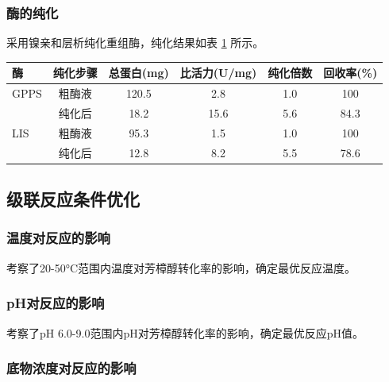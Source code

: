 \subsubsection{酶的纯化}


采用镍亲和层析纯化重组酶，纯化结果如表 \ref{tab:purification} 所示。

\begin{table}[h]
  \centering
  \label{tab:purification}
  \begin{tabular}{lccccc}
    \toprule
    \textbf{酶} & \textbf{纯化步骤} & \textbf{总蛋白(mg)} & \textbf{比活力(U/mg)} & \textbf{纯化倍数} & \textbf{回收率(\%)} \\
    \midrule
    GPPS & 粗酶液 & 120.5 & 2.8 & 1.0 & 100 \\
         & 纯化后 & 18.2 & 15.6 & 5.6 & 84.3 \\
    \midrule
    LIS & 粗酶液 & 95.3 & 1.5 & 1.0 & 100 \\
        & 纯化后 & 12.8 & 8.2 & 5.5 & 78.6 \\
    \bottomrule
  \end{tabular}
\end{table}

\subsection{级联反应条件优化}

\subsubsection{温度对反应的影响}


考察了20-50°C范围内温度对芳樟醇转化率的影响，确定最优反应温度。

\subsubsection{pH对反应的影响}


考察了pH 6.0-9.0范围内pH对芳樟醇转化率的影响，确定最优反应pH值。

\subsubsection{底物浓度对反应的影响}

